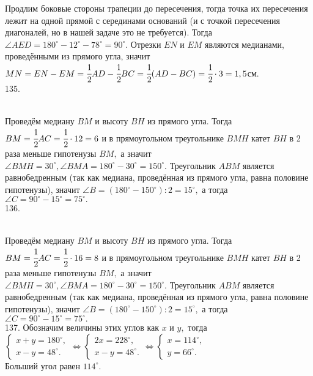 Продлим боковые стороны трапеции до пересечения, тогда точка их пересечения лежит на одной прямой с серединами оснований (и с точкой пересечения диагоналей, но в нашей задаче это не требуется). Тогда $\angle AED=180^\circ-12^\circ-78^\circ=90^\circ.$ Отрезки $EN$ и $EM$ являются медианами, проведёнными из прямого угла, значит $MN=EN-EM=\cfrac{1}{2}AD-\cfrac{1}{2}BC=\cfrac{1}{2}(AD-BC)=\cfrac{1}{2}\cdot3=1,5$см.\\
135. \begin{figure}[ht!]
\end{figure}\\
Проведём медиану $BM$ и высоту $BH$ из прямого угла. Тогда $BM=\cfrac{1}{2}AC=\cfrac{1}{2}\cdot12=6$ и в прямоугольном треугольнике $BMH$ катет $BH$ в 2 раза меньше гипотенузы $BM,$ а значит $\angle BMH=30^\circ, \angle BMA=180^\circ-30^\circ=150^\circ.$ Треугольник $ABM$ является равнобедренным (так как медиана, проведённая из прямого угла, равна половине гипотенузы), значит $\angle B=(180^\circ-150^\circ):2=15^\circ,$ а тогда $\angle C=90^\circ-15^\circ=75^\circ.$\\
136. \begin{figure}[ht!]
\end{figure}\\
Проведём медиану $BM$ и высоту $BH$ из прямого угла. Тогда $BM=\cfrac{1}{2}AC=\cfrac{1}{2}\cdot16=8$ и в прямоугольном треугольнике $BMH$ катет $BH$ в 2 раза меньше гипотенузы $BM,$ а значит $\angle BMH=30^\circ, \angle BMA=180^\circ-30^\circ=150^\circ.$ Треугольник $ABM$ является равнобедренным (так как медиана, проведённая из прямого угла, равна половине гипотенузы), значит $\angle B=(180^\circ-150^\circ):2=15^\circ,$ а тогда $\angle C=90^\circ-15^\circ=75^\circ.$\\
137. Обозначим величины этих углов как $x$ и $y,$ тогда $\begin{cases} x+y=180^\circ,\\x-y=48^\circ.\end{cases}\Leftrightarrow
\begin{cases} 2x=228^\circ,\\x-y=48^\circ.\end{cases}\Leftrightarrow\begin{cases} x=114^\circ,\\y=66^\circ.\end{cases}$\\
Больший угол равен $114^\circ.$\\

